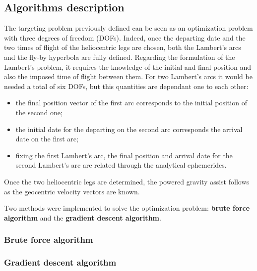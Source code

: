 \subsection{Algorithms description}
\label{subsec:algo_description}
The targeting problem previously defined can be seen as an optimization problem with three degrees of freedom (DOFs). Indeed, once the departing date and the two times of flight of the heliocentric legs are chosen, both the Lambert's arcs and the fly-by hyperbola are fully defined.  
Regarding the formulation of the Lambert's problem, it requires the knowledge of the initial and final position and also the imposed time of flight between them. For two Lambert's arcs it would be needed a total of six DOFs, but this quantities are dependant one to each other:
\begin{itemize}
    [wide,itemsep=3pt,topsep=3pt]
    \item the final position vector of the first arc corresponds to the initial position of the second one;
    \item the initial date for the departing on the second arc corresponds the arrival date on the first arc;
    \item fixing the first Lambert's arc, the final position and arrival date for the second Lambert's arc are related through the analytical ephemerides.
\end{itemize}

Once the two heliocentric legs are determined, the powered gravity assist follows as the geocentric velocity vectors are known.

Two methods were implemented to solve the optimization problem: \textbf{brute force algorithm} and the \textbf{gradient descent algorithm}.

\subsubsection{Brute force algorithm}
\label{subsubsec:brute_force_algo}

\subsubsection{Gradient descent algorithm}
\label{subsubsec:gradient_algo}